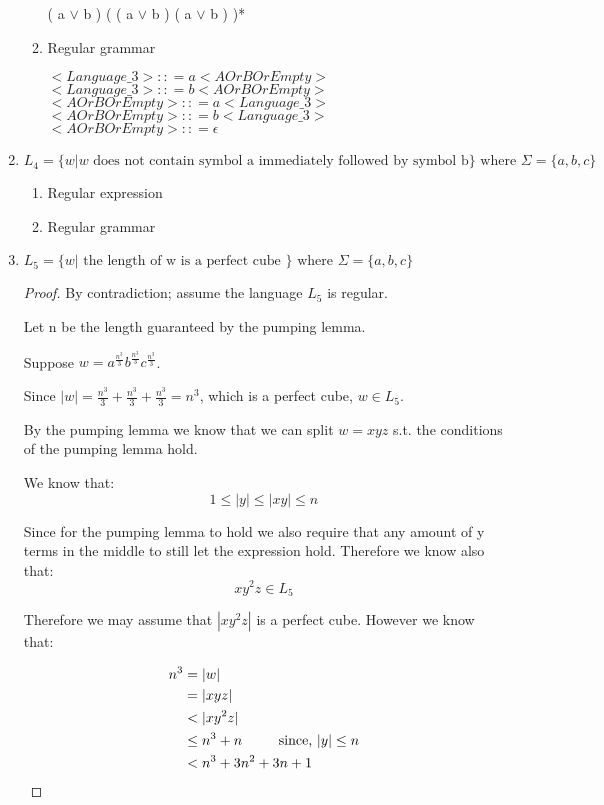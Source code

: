 \begin{enumerate}
\begin{enumerate}
		( a \(\vee\) b ) ( ( a \(\vee\)  b ) ( a \(\vee\) b ) )*
		\item{Regular grammar}
		
		\( <Language\_3> :: = a <AOrBOrEmpty> \)\\
		\( <Language\_3> :: = b <AOrBOrEmpty> \)\\
		\( <AOrBOrEmpty> :: = a <Language\_3> \)\\
		\( <AOrBOrEmpty> :: = b <Language\_3> \)\\
		\( <AOrBOrEmpty> :: = \epsilon \)
	\end{enumerate}
	
	\item\(L_4 = \{ w | w \text{ does not contain symbol a immediately followed by symbol b} \} \text{ where } \Sigma = \{ a, b, c \} \)
	
	\begin{enumerate}
		\item{Regular expression}
		
		\item{Regular grammar}
		
	\end{enumerate}
	
	\item\(L_5 = \{ w | \text{ the length of w is a perfect cube } \} \text{ where } \Sigma = \{ a, b, c \} \)
	
	\begin{proof}
	By contradiction; assume the language \(L_5\) is regular.
	
	Let n be the length guaranteed by the pumping lemma.   
	
	Suppose \( w = a^{\frac{n^3}{3}} b^{\frac{n^3}{3}} c^{\frac{n^3}{3}} \).
	
	Since \( |w| = \frac{n^3}{3} + \frac{n^3}{3} + \frac{n^3}{3} = n^3 \), which is a perfect cube, \( w \in L_5 \).
	
	By the pumping lemma we know that we can split \( w = xyz \) s.t. the conditions of the pumping lemma hold.
	
	We know that:
	\[
		1 \leq | y | \leq | xy | \leq n
	\]
	
	Since for the pumping lemma to hold we also require that any amount of y terms in the middle to still let the expression hold. Therefore we know also that:
	\[
		xy^2z \in L_5
	\]
	
	Therefore we may assume that \( | xy^2z | \) is a perfect cube.  However we know that:
	
	\begin{align}
		n^3 {}& = | w | \\
		       {}& = | xyz | \\
		       {}& < | xy^2z | \\
		       {}& \leq n^3 + n \hspace*{8mm}\text{ since, } | y | \leq n \\
		       {}& < n^3 + 3n^2 + 3n + 1
	\end{align}
	

\end{proof}
\end{enumerate}
